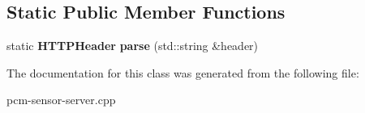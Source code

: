 \subsection*{Static Public Member Functions}
\begin{DoxyCompactItemize}
\item 
\mbox{\label{classHTTPHeader_a9510c0e4ebddec70330a7d094e5d5a5b}} 
static \textbf{ H\+T\+T\+P\+Header} {\bfseries parse} (std\+::string \&header)
\end{DoxyCompactItemize}


The documentation for this class was generated from the following file\+:\begin{DoxyCompactItemize}
\item 
pcm-\/sensor-\/server.\+cpp\end{DoxyCompactItemize}
